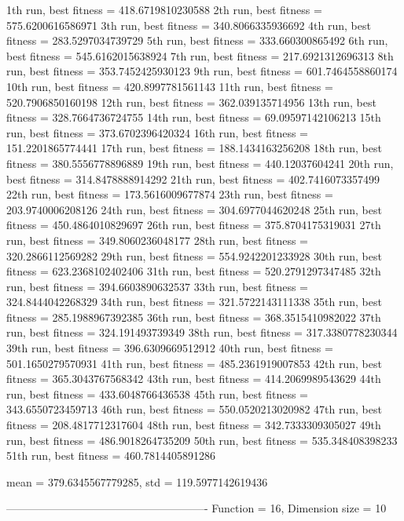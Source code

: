 1th run, best fitness = 418.6719810230588
2th run, best fitness = 575.6200616586971
3th run, best fitness = 340.8066335936692
4th run, best fitness = 283.5297034739729
5th run, best fitness = 333.660300865492
6th run, best fitness = 545.6162015638924
7th run, best fitness = 217.6921312696313
8th run, best fitness = 353.7452425930123
9th run, best fitness = 601.7464558860174
10th run, best fitness = 420.8997781561143
11th run, best fitness = 520.7906850160198
12th run, best fitness = 362.039135714956
13th run, best fitness = 328.7664736724755
14th run, best fitness = 69.09597142106213
15th run, best fitness = 373.6702396420324
16th run, best fitness = 151.2201865774441
17th run, best fitness = 188.1434163256208
18th run, best fitness = 380.5556778896889
19th run, best fitness = 440.12037604241
20th run, best fitness = 314.8478888914292
21th run, best fitness = 402.7416073357499
22th run, best fitness = 173.5616009677874
23th run, best fitness = 203.9740006208126
24th run, best fitness = 304.6977044620248
25th run, best fitness = 450.4864010829697
26th run, best fitness = 375.8704175319031
27th run, best fitness = 349.8060236048177
28th run, best fitness = 320.2866112569282
29th run, best fitness = 554.9242201233928
30th run, best fitness = 623.2368102402406
31th run, best fitness = 520.2791297347485
32th run, best fitness = 394.6603890632537
33th run, best fitness = 324.8444042268329
34th run, best fitness = 321.5722143111338
35th run, best fitness = 285.1988967392385
36th run, best fitness = 368.3515410982022
37th run, best fitness = 324.191493739349
38th run, best fitness = 317.3380778230344
39th run, best fitness = 396.6309669512912
40th run, best fitness = 501.1650279570931
41th run, best fitness = 485.2361919007853
42th run, best fitness = 365.3043767568342
43th run, best fitness = 414.2069989543629
44th run, best fitness = 433.6048766436538
45th run, best fitness = 343.6550723459713
46th run, best fitness = 550.0520213020982
47th run, best fitness = 208.4817712317604
48th run, best fitness = 342.7333309305027
49th run, best fitness = 486.9018264735209
50th run, best fitness = 535.348408398233
51th run, best fitness = 460.7814405891286

mean = 379.6345567779285, std = 119.5977142619436

-------------------------------------------------------
Function = 16, Dimension size = 10

